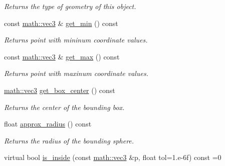 \begin{DoxyCompactItemize}
\begin{DoxyCompactList}\small\item\em Returns the type of geometry of this object. \end{DoxyCompactList}\item 
\mbox{\label{classphysim_1_1geometric_1_1geometry_aa5ee497ba6c15da3be5087cab53f2754}} 
const \hyperlink{structphysim_1_1math_1_1vec3}{math\+::vec3} \& \hyperlink{classphysim_1_1geometric_1_1geometry_aa5ee497ba6c15da3be5087cab53f2754}{get\+\_\+min} () const
\begin{DoxyCompactList}\small\item\em Returns point with mininum coordinate values. \end{DoxyCompactList}\item 
\mbox{\label{classphysim_1_1geometric_1_1geometry_a6ab9de84b1241c1e82187efb0398ddb3}} 
const \hyperlink{structphysim_1_1math_1_1vec3}{math\+::vec3} \& \hyperlink{classphysim_1_1geometric_1_1geometry_a6ab9de84b1241c1e82187efb0398ddb3}{get\+\_\+max} () const
\begin{DoxyCompactList}\small\item\em Returns point with maxinum coordinate values. \end{DoxyCompactList}\item 
\mbox{\label{classphysim_1_1geometric_1_1geometry_a5b82ef61d845a8dc4adf4ae97d39c312}} 
\hyperlink{structphysim_1_1math_1_1vec3}{math\+::vec3} \hyperlink{classphysim_1_1geometric_1_1geometry_a5b82ef61d845a8dc4adf4ae97d39c312}{get\+\_\+box\+\_\+center} () const
\begin{DoxyCompactList}\small\item\em Returns the center of the bounding box. \end{DoxyCompactList}\item 
float \hyperlink{classphysim_1_1geometric_1_1geometry_a570de2d1faf50b787ec2f72703c41e19}{approx\+\_\+radius} () const
\begin{DoxyCompactList}\small\item\em Returns the radius of the bounding sphere. \end{DoxyCompactList}\item 
virtual bool \hyperlink{classphysim_1_1geometric_1_1geometry_a325d4049d4e14584b389a2f1202bdc08}{is\+\_\+inside} (const \hyperlink{structphysim_1_1math_1_1vec3}{math\+::vec3} \&p, float tol=1.e-\/6f) const =0

\end{DoxyCompactItemize}
